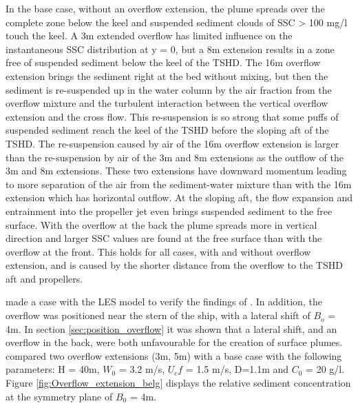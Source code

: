 \noindent In the base case, without an overflow extension, the plume spreads over the complete zone below the keel and suspended sediment clouds of SSC > 100 mg/l touch the keel. A 3m extended overflow has limited influence on the instantaneous SSC distribution at y = 0, but a 8m extension results in a zone free of suspended sediment below the keel of the TSHD. The 16m overflow extension brings the sediment right at the bed without mixing, but then the sediment is re-suspended up in the water column by the air fraction from the overflow mixture and the turbulent interaction between the vertical overflow extension and the cross flow. This re-suspension is so strong that some puffs of suspended sediment reach the keel of the TSHD before the sloping aft of the TSHD. The re-suspension caused by air of the 16m overflow extension is larger than the re-suspension by air of the 3m and 8m extensions as the outflow of the 3m and 8m extensions. These two extensions have downward momentum leading to more separation of the air from the sediment-water mixture than with the 16m extension which has horizontal outflow.\newline 
\noindent At the sloping aft, the flow expansion and entrainment into the propeller jet even brings suspended sediment to the free surface. With the overflow at the back the plume spreads more in vertical direction and larger SSC values are found at the free surface than with the overflow at the front. This holds for all cases, with and without overflow extension, and is caused by the shorter distance from the overflow to the TSHD aft and propellers. \newline

\noindent \cite{Decrop} made a case with the LES model to verify the findings of \cite{Dewit}. In addition, the overflow was positioned near the stern of the ship, with a lateral shift of $B_o$ =  4m. In section \ref{sec:position_overflow} it was shown that a lateral shift, and an overflow in the back, were both unfavourable for the creation of surface plumes. \cite{Decrop} compared two overflow extensions (3m, 5m) with a base case with the following parameters: H =  40m, $W_0$ =  3.2 m/s, $U_cf$ =  1.5 m/s, D=1.1m and $C_0$ =  20 g/l. Figure \ref{fig:Overflow_extension_belg} displays the relative sediment concentration at the symmetry plane of $B_0$ =  4m.


